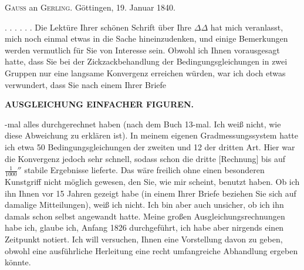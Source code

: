 \bigskip
{\centering
\textsc{Gauss} an \textsc{Gerling}. \quad Göttingen, 19. Januar 1840.\par}
\medskip

. . . . . . Die Lektüre Ihrer schönen Schrift über Ihre \(\Delta\Delta\) hat mich veranlasst, mich noch einmal etwas in die Sache hineinzudenken, und einige Bemerkungen werden vermutlich für Sie von Interesse sein. Obwohl ich Ihnen vorausgesagt hatte, dass Sie bei der Zickzackbehandlung der Bedingungsgleichungen in zwei Gruppen nur eine langsame Konvergenz erreichen würden, war ich doch etwas verwundert, dass Sie nach einem Ihrer Briefe

\par\clearpage
\noindent\null\hfill{\small\textbf{AUSGLEICHUNG EINFACHER FIGUREN.}}\hfill{}\par\medskip

-mal alles durchgerechnet haben (nach dem Buch 13-mal. Ich weiß nicht, wie diese Abweichung zu erklären ist). In meinem eigenen Gradmessungssystem hatte ich etwa 50 Bedingungsgleichungen der zweiten und 12 der dritten Art. Hier war die Konvergenz jedoch sehr schnell, sodass schon die dritte [Rechnung] bis auf \(\frac{1}{1000}''\) stabile Ergebnisse lieferte. Das wäre freilich ohne einen besonderen Kunstgriff nicht möglich gewesen, den Sie, wie mir scheint,  benutzt haben. Ob ich ihn Ihnen vor 15 Jahren gezeigt habe (in einem Ihrer Briefe beziehen Sie sich auf damalige Mitteilungen), weiß ich nicht. Ich bin aber auch unsicher, ob ich ihn damals schon selbst angewandt hatte. Meine großen Ausgleichungsrechnungen habe ich, glaube ich, Anfang 1826 durchgeführt, ich habe aber nirgends einen Zeitpunkt notiert. Ich will versuchen, Ihnen eine Vorstellung davon zu geben, obwohl eine ausführliche Herleitung eine recht umfangreiche Abhandlung ergeben könnte.

